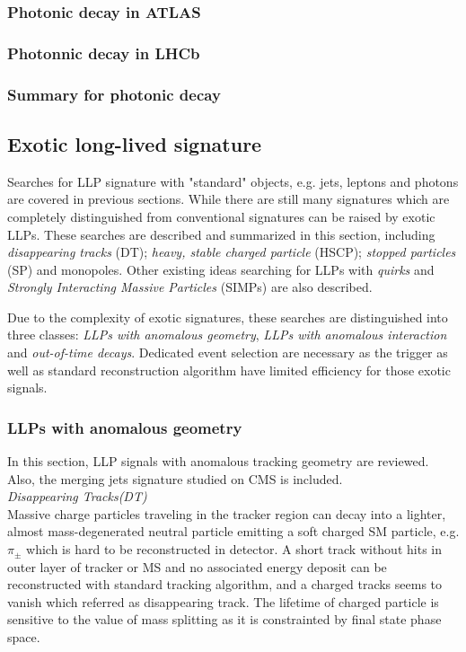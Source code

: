 \subsubsection{Photonic decay in ATLAS}

\subsubsection{Photonnic decay in LHCb}

\subsubsection{Summary for photonic decay}

\subsection{Exotic long-lived signature}

Searches for LLP signature with "standard" objects, e.g. jets, leptons and photons are covered in previous sections. While there are still many signatures which are completely distinguished from conventional signatures can be raised by exotic LLPs. These searches are described and summarized in this section, including \textit{disappearing tracks} (DT); \textit{heavy, stable charged particle} (HSCP); \textit{stopped particles} (SP) and monopoles. Other existing ideas searching for LLPs with \textit{quirks} and \textit{Strongly Interacting Massive Particles} (SIMPs) are also described. 

Due to the complexity of exotic signatures, these searches are distinguished into three classes: \textit{LLPs with anomalous geometry}, \textit{LLPs with anomalous interaction} and  \textit{out-of-time decays}. Dedicated event selection are necessary as the trigger as well as  standard reconstruction algorithm have limited efficiency for those exotic signals. 

\subsubsection{LLPs with anomalous geometry}
In this section, LLP signals with anomalous tracking geometry are reviewed. Also, the merging jets signature studied on CMS is included. \\

\textit{Disappearing Tracks(DT)}\\

Massive charge particles traveling in the tracker region can decay into a lighter, almost mass-degenerated neutral particle emitting a soft charged SM particle, e.g. $\pi_{\pm}$ which is hard to be reconstructed in detector. A short track without hits in outer layer of tracker or MS and no associated energy deposit can be reconstructed with standard tracking algorithm, and a charged tracks seems to vanish which referred as disappearing track. The lifetime of charged particle is sensitive to the value of mass splitting as it is constrainted by final state phase space.

